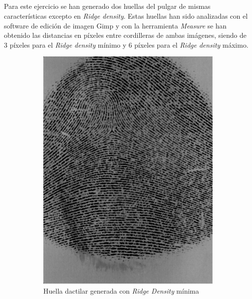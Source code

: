 \documentclass[10pt,a4paper]{article}
\begin{document}
\subsection{}
Para este ejercicio se han generado dos huellas del pulgar de mismas características excepto en \textit{Ridge density}. Estas huellas han sido analizadas con el software de edición de imagen Gimp y con la herramienta \textit{Measure} se han obtenido las distancias en píxeles entre cordilleras de ambas imágenes, siendo de 3 píxeles para el \textit{Ridge density} mínimo y 6 píxeles para el \textit{Ridge density} máximo.
\begin{figure}[h!]
\centering
\begin{subfigure}{.5\textwidth}
  \centering
  \includegraphics[width=.7\linewidth]{1.2/min_original.png}
  \caption{Huella dactilar generada con \textit{Ridge Density} mínima}
  \label{fig:min_ridge}
\end{subfigure}%
\begin{subfigure}{.5\textwidth}
  \centering

\end{subfigure}
\end{figure}
\end{document}
